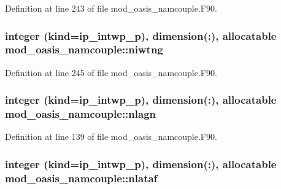 Definition at line 243 of file mod\+\_\+oasis\+\_\+namcouple.\+F90.

\hypertarget{classmod__oasis__namcouple_a3379333e7d0f24b776c81b1087f3a3b4}{
\subsubsection[{niwtng}]{\setlength{\rightskip}{0pt plus 5cm}integer (kind=ip\+\_\+intwp\+\_\+p), dimension(\+:), allocatable mod\+\_\+oasis\+\_\+namcouple\+::niwtng\hspace{0.3cm}{\ttfamily [private]}}}\label{classmod__oasis__namcouple_a3379333e7d0f24b776c81b1087f3a3b4}


Definition at line 245 of file mod\+\_\+oasis\+\_\+namcouple.\+F90.

\hypertarget{classmod__oasis__namcouple_aad06af35c92de78d71671d39bcbb1690}{
\subsubsection[{nlagn}]{\setlength{\rightskip}{0pt plus 5cm}integer (kind=ip\+\_\+intwp\+\_\+p), dimension(\+:), allocatable mod\+\_\+oasis\+\_\+namcouple\+::nlagn\hspace{0.3cm}{\ttfamily [private]}}}\label{classmod__oasis__namcouple_aad06af35c92de78d71671d39bcbb1690}


Definition at line 139 of file mod\+\_\+oasis\+\_\+namcouple.\+F90.

\hypertarget{classmod__oasis__namcouple_a80d81b2f026a2d0dc2de27b9ee04f7af}{
\subsubsection[{nlataf}]{\setlength{\rightskip}{0pt plus 5cm}integer (kind=ip\+\_\+intwp\+\_\+p), dimension(\+:), allocatable mod\+\_\+oasis\+\_\+namcouple\+::nlataf\hspace{0.3cm}{\ttfamily [private]}}}\label{classmod__oasis__namcouple_a80d81b2f026a2d0dc2de27b9ee04f7af}


